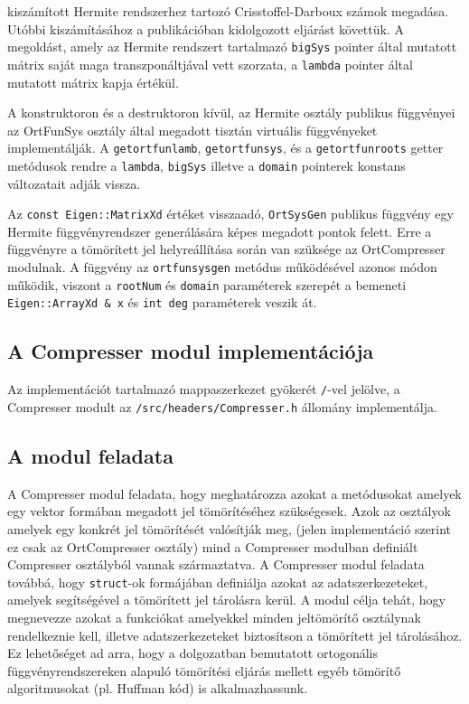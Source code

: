 \documentclass[oneside,titlepage,12pt,a4paper]{report}
\begin{document}
kiszámított Hermite rendszerhez tartozó Crisstoffel-Darboux számok megadása. Utóbbi kiszámításához a \cite{} publikációban kidolgozott eljárást követtük. A megoldást, amely az Hermite rendszert tartalmazó \texttt{bigSys} pointer által mutatott mátrix saját maga transzponáltjával vett szorzata, a \texttt{lambda} pointer által mutatott mátrix kapja értékül. 
\par A konstruktoron és a destruktoron kívül, az Hermite osztály publikus függvényei az OrtFunSys osztály által megadott tisztán virtuális függvényeket implementálják. A \texttt{getortfunlamb}, \texttt{getortfunsys}, és a \texttt{getortfunroots} getter metódusok rendre a \texttt{lambda}, \texttt{bigSys} illetve a \texttt{domain} pointerek konstans változatait adják vissza. 
\par Az \texttt{const Eigen::MatrixXd} értéket visszaadó, \texttt{OrtSysGen} publikus függvény egy Hermite függvényrendszer generálására képes megadott pontok felett. Erre a függvényre a tömörített jel helyreállítása során van szüksége az OrtCompresser modulnak. A függvény az \texttt{ortfunsysgen} metódus működésével azonos módon működik, viszont a \texttt{rootNum} és \texttt{domain} paraméterek szerepét a bemeneti \texttt{Eigen::ArrayXd \& x} és \texttt{int deg} paraméterek veszik át.   

\subsection{A Compresser modul implementációja}

Az implementációt tartalmazó mappaszerkezet gyökerét \texttt{/}-vel jelölve, a Compresser modult  az \texttt{/src/headers/Compresser.h} állomány implementálja.

\subsection*{A modul feladata}

\par A Compresser modul feladata, hogy meghatározza azokat a metódusokat amelyek egy vektor formában megadott jel tömörítéséhez szükségesek. Azok az osztályok amelyek egy konkrét jel tömörítését valósítják meg, (jelen implementáció szerint ez csak az OrtCompresser osztály) mind a Compresser modulban definiált Compresser osztályból vannak származtatva. A Compresser modul feladata továbbá, hogy \texttt{struct}-ok formájában definiálja azokat az adatszerkezeteket, amelyek segítségével a tömörített jel tárolásra kerül. A modul célja tehát, hogy megnevezze azokat a funkciókat amelyekkel minden jeltömörítő osztálynak rendelkeznie kell, illetve adatszerkezeteket biztosítson a tömörített jel tárolásához. Ez lehetőséget ad arra, hogy a dolgozatban bemutatott ortogonális függvényrendszereken alapuló tömörítési eljárás mellett egyéb tömörítő algoritmusokat (pl. Huffman kód) is alkalmazhassunk.  
\end{document}
